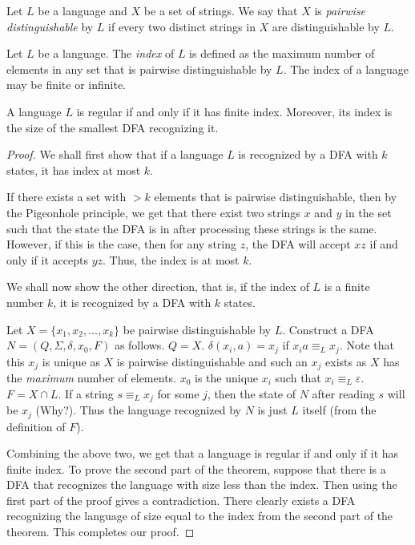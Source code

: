 \begin{definition}
Let $L$ be a language and $X$ be a set of strings. We say that $X$ is \textit{pairwise distinguishable} by $L$ if every two distinct strings in $X$ are distinguishable by $L$. 
\end{definition}
\begin{definition}
Let $L$ be a language. The \textit{index} of $L$ is defined as the maximum number of elements in any set that is pairwise distinguishable by $L$. The index of a language may be finite or infinite.
\end{definition}
\begin{theorem}
A language $L$ is regular if and only if it has finite index. Moreover, its index is the size of the smallest DFA recognizing it.
\end{theorem}
\begin{proof}
We shall first show that if a language $L$ is recognized by a DFA with $k$ states, it has index at most $k$.

If there exists a set with $> k$ elements that is pairwise distinguishable, then by the Pigeonhole principle, we get that there exist two strings $x$ and $y$ in the set such that the state the DFA is in after processing these strings is the same. However, if this is the case, then for any string $z$, the DFA will accept $xz$ if and only if it accepts $yz$. Thus, the index is at most $k$.

\vspace{2mm}
We shall now show the other direction, that is, if the index of $L$ is a finite number $k$, it is recognized by a DFA with $k$ states.

Let $X=\{x_1,x_2,\ldots,x_k\}$ be pairwise distinguishable by $L$. Construct a DFA $N=(Q,\Sigma,\delta,x_0,F)$ as follows. $Q=X$. $\delta(x_i,a)=x_j$ if $x_ia\equiv_Lx_j$. Note that this $x_j$ is unique as $X$ is pairwise distinguishable and such an $x_j$ exists as $X$ has the \textit{maximum} number of elements. $x_0$ is the unique $x_i$ such that $x_i\equiv_L\varepsilon$. $F=X\cap L$. If a string $s\equiv_Lx_j$ for some $j$, then the state of $N$ after reading $s$ will be $x_j$ (Why?). Thus the language recognized by $N$ is just $L$ itself (from the definition of $F$).

\vspace{2mm}
Combining the above two, we get that a language is regular if and only if it has finite index. To prove the second part of the theorem, suppose that there is a DFA that recognizes the language with size less than the index. Then using the first part of the proof gives a contradiction. There clearly exists a DFA recognizing the language of size equal to the index from the second part of the theorem. This completes our proof.
\end{proof}
\clearpage


